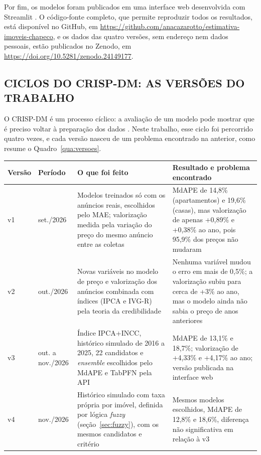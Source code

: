 \documentclass[
  article,
  a4paper,
  12pt,
  fleqn,
  oneside,
  chapter = TITLE,
  section = TITLE,
]{abntex2}
\begin{document}
Por fim, os modelos foram publicados em uma interface web desenvolvida com Streamlit \cite{streamlit}. O código-fonte completo, que permite reproduzir todos os resultados, está disponível no GitHub, em \url{https://github.com/anacazarotto/estimativa-imoveis-chapeco}, e os dados das quatro versões, sem endereço nem dados pessoais, estão publicados no Zenodo, em \url{https://doi.org/10.5281/zenodo.24149177}.
\subsection{CICLOS DO CRISP-DM: AS VERSÕES DO TRABALHO}\label{sec:versoes}

O CRISP-DM é um processo cíclico: a avaliação de um modelo pode mostrar que é preciso voltar à preparação dos dados \cite{chapman2000}. Neste trabalho, esse ciclo foi percorrido quatro vezes, e cada versão nasceu de um problema encontrado na anterior, como resume o Quadro~\ref{qua:versoes}.

\begin{quadro}[!htb]
  \caption{Linha do tempo das versões do trabalho}
  \label{qua:versoes}
  \centering
  \footnotesize
  \begin{tabular}{|>{\raggedright\arraybackslash}p{1.1cm}|>{\raggedright\arraybackslash}p{1.6cm}|>{\raggedright\arraybackslash}p{5.3cm}|>{\raggedright\arraybackslash}p{5.3cm}|}
    \hline
    \textbf{Versão} & \textbf{Período} & \textbf{O que foi feito} & \textbf{Resultado e problema encontrado} \tabularnewline
    \hline
    v1 & set./2026 & Modelos treinados só com os anúncios reais, escolhidos pelo MAE; valorização medida pela variação do preço do mesmo anúncio entre as coletas & MdAPE de 14,8\% (apartamentos) e 19,6\% (casas), mas valorização de apenas +0,89\% e +0,38\% ao ano, pois 95,9\% dos preços não mudaram \tabularnewline
    \hline
    v2 & out./2026 & Novas variáveis no modelo de preço e valorização dos anúncios combinada com índices (IPCA e IVG-R) pela teoria da credibilidade & Nenhuma variável mudou o erro em mais de 0,5\%; a valorização subiu para cerca de +3\% ao ano, mas o modelo ainda não sabia o preço de anos anteriores \tabularnewline
    \hline
    v3 & out. a nov./2026 & Índice IPCA+INCC, histórico simulado de 2016 a 2025, 22 candidatos e \textit{ensemble} escolhidos pelo MdAPE e TabPFN pela API & MdAPE de 13,1\% e 18,7\%; valorização de +4,33\% e +4,17\% ao ano; versão publicada na interface web \tabularnewline
    \hline
    v4 & nov./2026 & Histórico simulado com taxa própria por imóvel, definida por lógica \textit{fuzzy} (seção~\ref{sec:fuzzy}), com os mesmos candidatos e critério & Mesmos modelos escolhidos, MdAPE de 12,8\% e 18,6\%, diferença não significativa em relação à v3 \tabularnewline
    \hline
  \end{tabular}
\end{quadro}
\end{document}
